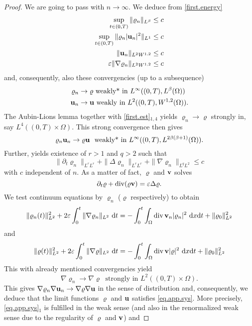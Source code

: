 \documentclass{article}
\DeclareMathOperator{\diver}{div}
\newcommand{\bu}{{\bf u}}
\newcommand{\vu}{\bu}
\newcommand{\bv}{{\bf v}}
\newcommand{\vv}{\bv}
\newcommand{\pat}{\partial_t}
\numberwithin{equation}{section}
\begin{document}
\begin{proof}
We are going to pass with $n\to\infty$. We deduce from \eqref{first.energy} 
\begin{equation}
\begin{split}\label{first.est}
\sup_{t\in(0,T)} \|\varrho_n\|_{L^\beta} &\leq c\\
\sup_{t\in(0,T)} \|\varrho_n|\vu_n|^2\|_{L^1} & \leq c\\
\|\vu_n\|_{L^2 W^{1,2}} & \leq c\\
\varepsilon \|\nabla\varrho_n\|_{L^2W^{1,2}}& \leq c
\end{split}
\end{equation}
and, consequently, also these convergencies (up to a subsequence)
\begin{equation*}
\begin{split}
\varrho_n&\to\varrho\ \mbox{weakly* in }L^\infty((0,T),L^\beta(\Omega))\\
\vu_n&\to \vu \ \mbox{weakly in } L^2((0,T),W^{1,2}(\Omega)).
\end{split}
\end{equation*}
The Aubin-Lions lemma together with \eqref{first.est}$_{1,4}$ yields $\varrho_n\to\varrho$ strongly in, say $L^4((0,T)\times \Omega)$. This strong convergence then gives
$$
\varrho_n\vu_n \to \varrho \vu\ \mbox{ weakly* in } L^\infty((0,T),L^{2\beta(\beta+1)}(\Omega)).
$$
Further, \cite[Lemma 2.4]{FeNoPe} yields existence of $r>1$ and $q>2$ such that
\begin{equation*}
\|\pat\varrho_n\|_{L^rL^r} + \|\Delta\varrho_n\|_{L^rL^r} + \|\nabla\varrho_n\|_{L^qL^2} \leq c
\end{equation*}
with $c$ independent of $n$. As a matter of fact, $\varrho$ and $\vv$ solves
$$
\pat\varrho + \diver(\varrho\vv) = \varepsilon \Delta\varrho.
$$
We test continuum equations by $\varrho_n$ ($\varrho$ respectively) to obtain
$$
\|\varrho_n(t)\|_{L^2}^2 + 2\varepsilon \int_0^t\|\nabla \varrho_n\|_{L^2}\ {\rm d}t = -\int_0^t\int_\Omega \diver \vv_n |\varrho_n|^2 \ {\rm d}x{\rm d}t + \|\varrho_0\|_{L^2}^2
$$
and
$$
\|\varrho(t)\|_{L^2}^2 + 2\varepsilon \int_0^t\|\nabla \varrho\|_{L^2}\ {\rm d}t = -\int_0^t\int_\Omega \diver \vv |\varrho|^2 \ {\rm d}x{\rm d}t + \|\varrho_0\|_{L^2}^2
$$
This with already mentioned convergencies yield
$$
\nabla\varrho_n \to \nabla\varrho\ \mbox{ strongly in }L^2((0,T)\times\Omega).
$$
This gives $\nabla\varrho_n\nabla\vu_n\to \nabla\varrho \nabla \vu$ in the sense of distribution and, consequently, we deduce that the limit functions $\varrho$ and $\vu$ satisfies \eqref{eq.app.sys}. More precisely, \eqref{eq.app.sys}$_1$ is fulfilled in the weak sense (and also in the renormalized weak sense due to the regularity of $\varrho$ and $\vv$) and 

\end{proof}
\end{document}

